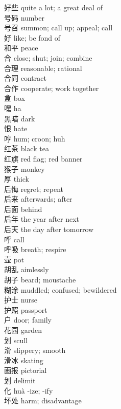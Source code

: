 好些 \quad quite a lot; a great deal of\\
号码 \quad number\\
号召 \quad summon; call up; appeal; call\\
好 \quad like; be fond of\\
和平 \quad peace\\
合 \quad close; shut; join; combine\\
合理 \quad reasonable; rational\\
合同 \quad contract\\
合作 \quad cooperate; work together\\
盒 \quad box\\
嘿 \quad ha\\
黑暗 \quad dark\\
恨 \quad hate\\
哼 \quad hum; croon; huh\\
红茶 \quad black tea\\
红旗 \quad red flag; red banner\\
猴子 \quad monkey\\
厚 \quad thick\\
后悔 \quad regret; repent\\
后来 \quad afterwards; after\\
后面 \quad behind\\
后年 \quad the year after next\\
后天 \quad the day after tomorrow\\
呼 \quad call\\
呼吸 \quad breath; respire\\
壶 \quad pot\\
胡乱 \quad aimlessly\\
胡子 \quad beard; moustache\\
糊涂 \quad muddled; confused; bewildered\\
护士 \quad nurse\\
护照 \quad passport\\
户 \quad door; family\\
花园 \quad garden\\
划 \quad scull\\
滑 \quad slippery; smooth\\
滑冰 \quad skating\\
画报 \quad pictorial\\
划 \quad delimit\\
化 \quad huà \quad -ize; -ify\\
坏处 \quad harm; disadvantage\\
